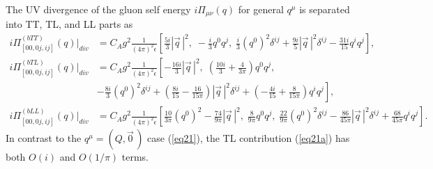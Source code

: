 \documentclass[preprint,amsmath,amssymb,superscriptaddress, floatfix,nofootinbib]{revtex4}
\begin{document}
The UV divergence of the 
gluon self energy $i\Pi_{\mu\nu}(q)$ for general $q^{\mu}$ is separated 
into TT, TL, and LL parts as 
\begin{align}
i\Pi^{(bTT)}_{[00,0j,ij]}(q)|_{div} & 
= C_A g^2 \frac{1}{(4\pi)^2 \epsilon}  \left[ 
\frac{5i}{3}|\vec{q}\,|^2, \; 
-\frac{i}{3}q^0 {q}^j, \; 
\frac{i}{3} (q^0)^2 \delta^{ij} +\frac{9i}{5}|\vec{q}\,|^2 \delta^{ij}  
-\frac{31i}{15} {q}^i {q}^j \right] ,
\label{eq16a}
\\
%
i\Pi^{(bTL)}_{[00,0j,ij]}(q)|_{div} & 
= C_A g^2 \frac{1}{(4\pi)^2\epsilon} \left[ 
-\frac{16i}{3} |\vec{q}\,|^2, \;  
\left( \frac{10i}{3} + \frac{4}{3\pi} \right) q^0 {q}^j, \; 
\right. \nonumber \\
& \left. 
-\frac{8i}{3} (q^0)^2 \delta^{ij} +\left( \frac{8i}{15}-\frac{16}{15\pi} \right) 
|\vec{q}\,|^2 \delta^{ij}
+ \left( -\frac{4i}{15}+\frac{8}{15\pi} \right) {q}^i {q}^j
 \right] ,  \label{eq21a}
\\
%
i\Pi^{(bLL)}_{[00,0j,ij]}(q)|_{div} & 
= C_A g^2 \frac{1}{(4\pi)^2\epsilon} \left[ 
\frac{10}{3\pi}(q^0)^2-\frac{74}{9\pi}|\vec{q}\,|^2 , \; 
\frac{8}{9\pi} q^0 {q}^j, \; 
 \frac{22}{9\pi}(q^0)^2 \delta^{ij} -\frac{86}{45\pi} |\vec{q}\,|^2 \delta^{ij}
+\frac{68}{45\pi} {q}^i {q}^j  \right] .
\label{eq25a}
\end{align}
%
In contrast to the $q^{\mu}=(Q,\vec{0}\,)$ case (\ref{eq21}), 
the TL contribution (\ref{eq21a}) has both $O(i)$ and $O(1/\pi)$ terms.



%
%
%



\end{document}
